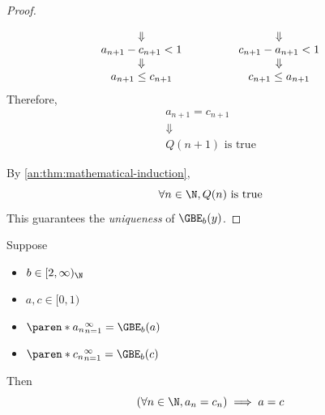 \begin{proof}
\begin{itemize}
\[\begin{array}{c@{\qquad\quad\qquad}c}
              \Downarrow                                                    & \Downarrow \\
              a_{n + 1} - c_{n + 1} < 1                                     &
              c_{n + 1} - a_{n + 1} < 1                                                  \\
              \Downarrow                                                    & \Downarrow \\
              a_{n + 1} \leq c_{n + 1}                                      &
              c_{n + 1} \leq a_{n + 1}
            \end{array}
          \]
          Therefore,
          \[
            \begin{array}{c}
              a_{n + 1} = c_{n + 1} \\
              \Downarrow            \\
              Q(n + 1) \text{ is true}
            \end{array}
          \]
  \end{itemize}
  By \cref{an:thm:mathematical-induction},
  \[
    \forall n \in \N, Q(n) \text{ is true}
  \]
  This guarantees the \emph{uniqueness} of $\GBE_{b}(y)$.
\end{proof}

\bigskip

\begin{theorem} \label{an:thm:same-greedy-base-expansion-implies-equality}
  Suppose
  \begin{itemize}
    \item $b \in [2, \infty)_{\N}$
    \item $a, c \in [0, 1)$
    \item $\paren*{a_{n}}_{n = 1}^{\infty} = \GBE_{b}(a)$
    \item $\paren*{c_{n}}_{n = 1}^{\infty} = \GBE_{b}(c)$
  \end{itemize}
  Then
  \[
    (\forall n \in \N, a_{n} = c_{n}) \implies a = c
  \]
\end{theorem}

